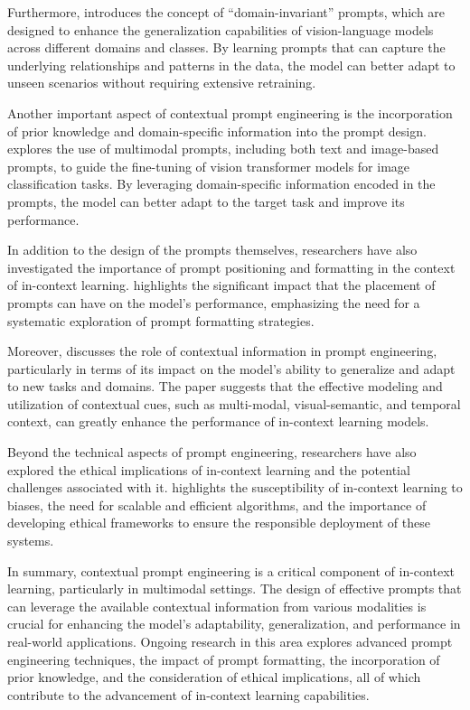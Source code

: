\documentclass[11pt]{article}
\begin{document}
Furthermore, \cite{ref180} introduces the concept of ``domain-invariant'' prompts, which are designed to enhance the generalization capabilities of vision-language models across different domains and classes. By learning prompts that can capture the underlying relationships and patterns in the data, the model can better adapt to unseen scenarios without requiring extensive retraining.

Another important aspect of contextual prompt engineering is the incorporation of prior knowledge and domain-specific information into the prompt design. \cite{ref181} explores the use of multimodal prompts, including both text and image-based prompts, to guide the fine-tuning of vision transformer models for image classification tasks. By leveraging domain-specific information encoded in the prompts, the model can better adapt to the target task and improve its performance.

In addition to the design of the prompts themselves, researchers have also investigated the importance of prompt positioning and formatting in the context of in-context learning. \cite{ref84} highlights the significant impact that the placement of prompts can have on the model's performance, emphasizing the need for a systematic exploration of prompt formatting strategies.

Moreover, \cite{ref138} discusses the role of contextual information in prompt engineering, particularly in terms of its impact on the model's ability to generalize and adapt to new tasks and domains. The paper suggests that the effective modeling and utilization of contextual cues, such as multi-modal, visual-semantic, and temporal context, can greatly enhance the performance of in-context learning models.

Beyond the technical aspects of prompt engineering, researchers have also explored the ethical implications of in-context learning and the potential challenges associated with it. \cite{ref81} highlights the susceptibility of in-context learning to biases, the need for scalable and efficient algorithms, and the importance of developing ethical frameworks to ensure the responsible deployment of these systems.

In summary, contextual prompt engineering is a critical component of in-context learning, particularly in multimodal settings. The design of effective prompts that can leverage the available contextual information from various modalities is crucial for enhancing the model's adaptability, generalization, and performance in real-world applications. Ongoing research in this area explores advanced prompt engineering techniques, the impact of prompt formatting, the incorporation of prior knowledge, and the consideration of ethical implications, all of which contribute to the advancement of in-context learning capabilities.
\end{document}
